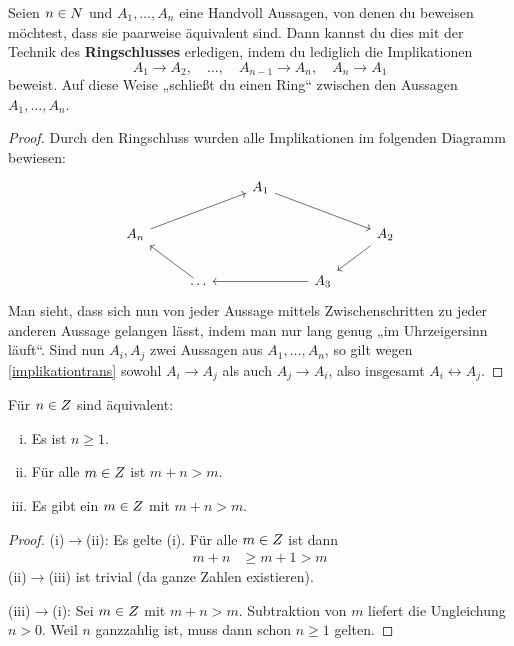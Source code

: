 \begin{satz}[Ringschluss] \label{ringschluss} 
    Seien $n\in \relax N$ und $A_1,\dots , A_n$ eine Handvoll Aussagen, von denen du beweisen möchtest, dass sie paarweise äquivalent sind. Dann kannst du dies mit der Technik des \textbf{Ringschlusses} erledigen, indem du lediglich die Implikationen
        \[ A_1\to A_2,\quad \dots ,\quad A_{n-1}\to A_n,\quad A_n\to A_1 \]
    beweist. Auf diese Weise „schließt du einen Ring“ zwischen den Aussagen $A_1,\dots , A_n$.
\end{satz}
\begin{proof}
    Durch den Ringschluss wurden alle Implikationen im folgenden Diagramm bewiesen:
    \[\begin{tikzcd}
        &&& A_1 \ar[rrd] &&& \\
        &A_n\ar[rru]&&&& A_2 \ar[ld]& \\
        && \dots \ar[lu] && A_3 \ar[ll]&& 
    \end{tikzcd} \]
    Man sieht, dass sich nun von jeder Aussage mittels Zwischenschritten zu jeder anderen Aussage gelangen lässt, indem man nur lang genug „im Uhrzeigersinn läuft“. Sind nun $A_i,A_j$ zwei Aussagen aus $A_1,\dots , A_n$, so gilt wegen \cref{implikationtrans} sowohl $A_i\to A_j$ als auch $A_j\to A_i$, also insgesamt $A_i\leftrightarrow A_j$.
\end{proof}


\begin{bsp} \label{bsp:ringschluss}
    Für $n\in \relax Z$ sind äquivalent:
    \begin{enumerate}[(i)]
        \item Es ist $n\ge 1$.
        \item Für alle $m\in \relax Z$ ist $m+n>m$.
        \item Es gibt ein $m\in \relax Z$ mit $m+n>m$.
    \end{enumerate}
\end{bsp}
\begin{proof}
    (i)$\to$(ii): Es gelte (i). Für alle $m\in \relax Z$ ist dann
    \begin{align*}
        m+n & \ge m+1 > m
    \end{align*}
    (ii)$\to$(iii) ist trivial (da ganze Zahlen existieren).

    (iii)$\to$(i): Sei $m\in \relax Z$ mit $m+n>m$. Subtraktion von $m$ liefert die Ungleichung $n>0$. Weil $n$ ganzzahlig ist, muss dann schon $n\ge 1$ gelten.
\end{proof}


